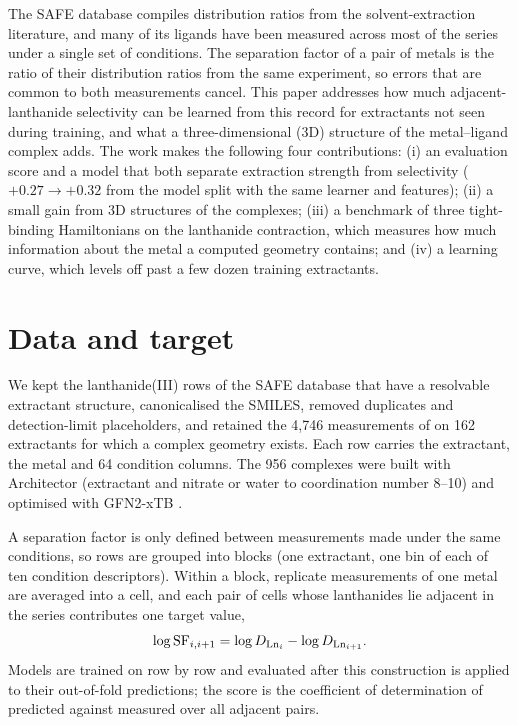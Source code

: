 The SAFE database \citep{safe2025} compiles distribution ratios from the solvent-extraction literature, and many of its ligands have been measured across most of the series under a single set of conditions. The separation factor of a pair of metals is the ratio of their distribution ratios from the same experiment, so errors that are common to both measurements cancel. This paper addresses how much adjacent-lanthanide selectivity can be learned from this record for extractants not seen during training, and what a three-dimensional (3D) structure of the metal--ligand complex adds. The work makes the following four contributions: (i) an evaluation score and a model that both separate extraction strength from selectivity ($+0.27 \to +0.32$ from the model split with the same learner and features); (ii) a small gain from 3D structures of the complexes; (iii) a benchmark of three tight-binding Hamiltonians on the lanthanide contraction, which measures how much information about the metal a computed geometry contains; and (iv) a learning curve, which levels off past a few dozen training extractants.

\section{Data and target}
\label{sec:data}
We kept the lanthanide(III) rows of the SAFE database that have a resolvable extractant structure, canonicalised the SMILES, removed duplicates and detection-limit placeholders, and retained the 4{,}746 measurements of \logD{} on 162 extractants for which a complex geometry exists. Each row carries the extractant, the metal and 64 condition columns. The 956 complexes were built with Architector \citep{architector} (extractant and nitrate or water to coordination number 8--10) and optimised with GFN2-xTB \citep{bannwarth2019gfn2}.

A separation factor is only defined between measurements made under the same conditions, so rows are grouped into blocks (one extractant, one bin of each of ten condition descriptors). Within a block, replicate \logD{} measurements of one metal are averaged into a cell, and each pair of cells whose lanthanides lie adjacent in the series contributes one target value,
\begin{equation}
  \log \mathrm{SF}_{i,i+1} = \log D_{\mathrm{Ln}_i} - \log D_{\mathrm{Ln}_{i+1}} .
  \label{eq:target}
\end{equation}
Models are trained on \logD{} row by row and evaluated after this construction is applied to their out-of-fold predictions; the score \adjR{} is the coefficient of determination of predicted against measured \logSF{} over all adjacent pairs.

